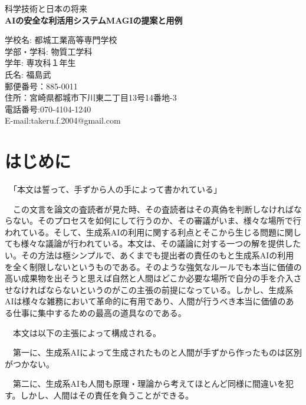 \documentclass{article}
\begin{document}
\begin{titlepage}
    \centering
    \vspace*{5cm} %
    {\LARGE 科学技術と日本の将来\\[1.5cm]}
    {\Large \textbf{AIの安全な利活用システムMAGIの提案と用例}\\[4cm]}
    
    \vfill %
    \raggedright
    \large 学校名: 都城工業高等専門学校\\
    学部・学科: 物質工学科\\
    学年: 専攻科１年生\\
    氏名: 福島武\\
    郵便番号：885-0011\\
    住所：宮崎県都城市下川東二丁目13号14番地-3\\
    電話番号:070-4104-1240\\
    E-mail:takeru.f.2004@gmail.com\\
    \vspace*{2cm}
\end{titlepage}


\section{はじめに}

　「本文は誓って、手ずから人の手によって書かれている」

　この文言を論文の査読者が見た時、その査読者はその真偽を判断しなければならない。そのプロセスを如何にして行うのか、その審議がいま、様々な場所で行われている\cite{mbsj2023ai_science_forum}\cite{editage2024icmje_ai_guidelines}。そして、生成系AIの利用に関する利点とそこから生じる問題に関しても様々な議論が行われている\cite{cstp_ai_strategy}\cite{mext2024ai_innovation}。本文は、その議論に対する一つの解を提供したい。その方法は極シンプルで、あくまでも提出者の責任のもと生成系AIの利用を全く制限しないというものである。そのような強気なルールでも本当に価値の高い成果物を出そうと思えば自然と人間はどこか必要な場所で自分の手を介入させなければならないというのがこの主張の前提になっている。しかし、生成系AIは様々な雑務において革命的に有用であり、人間が行うべき本当に価値のある仕事に集中するための最高の道具なのである。

　本文は以下の主張によって構成される。
 
 　第一に、生成系AIによって生成されたものと人間が手ずから作ったものは区別がつかない。
  
  　第二に、生成系AIも人間も原理・理論から考えてほとんど同様に間違いを犯す。しかし、人間はその責任を負うことができる。
   
\end{document}
